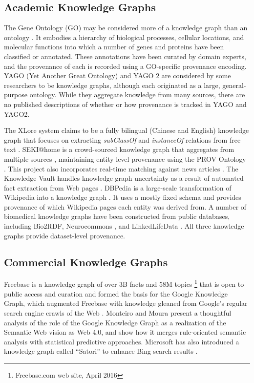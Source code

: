 \documentclass[runningheads,a4paper]{llncs}
\begin{document}
\subsection{Academic Knowledge Graphs}
The Gene Ontology (GO) may be considered more of a knowledge graph than an ontology \cite{Ashburner_2000}.
It embodies a hierarchy of biological processes, cellular locations, and molecular functions into which a number of genes and proteins have been classified or annotated.
These annotations have been curated by domain experts, and the provenance of each is recorded using a GO-specific provenance encoding.
YAGO (Yet Another Great Ontology) \cite{Suchanek_2007} and YAGO 2 \cite{Hoffart_2013} are considered by some researchers to be knowledge graphs, although each originated as a large, general-purpose ontology.
While they aggregate knowledge from many sources, there are no published descriptions of whether or how provenance is tracked in YAGO and YAGO2. 

The XLore system claims to be a fully bilingual (Chinese and English) knowledge graph that focuses on extracting \emph{subClassOf} and \emph{instanceOf} relations from free text \cite{wang2013xlore}.
SEKI@home is a crowd-sourced knowledge graph that aggregates from multiple sources \cite{steiner2012seki}, maintaining entity-level provenance using the PROV Ontology \cite{Moreau_2015}.
This project also incorporates real-time matching against news articles \cite{steiner_iswc_2012}.
The Knowledge Vault handles knowledge graph uncertainty as a result of automated fact extraction from Web pages \cite{Dong_2014}.
DBPedia is a large-scale transformation of Wikipedia into a knowledge graph \cite{Bizer_2009}.
It uses a mostly fixed schema and provides provenance of which Wikipedia pages each entity was derived from.
A number of biomedical knowledge graphs have been constructed from public databases, including Bio2RDF\cite{Callahan_2013}, Neurocommons \cite{Ruttenberg_2009}, and LinkedLifeData \cite{momtchev2009expanding}.
All three knowledge graphs provide dataset-level provenance.

\subsection{Commercial Knowledge Graphs}
Freebase is a knowledge graph of over 3B facts and 58M topics \footnote{Freebase.com web site, April 2016} that is open to public access and curation \cite{Bollacker_2008} and formed the basis for the Google Knowledge Graph, which augmented Freebase with knowledge gleaned from Google's regular search engine crawls of the Web \cite{singhal2012introducing}.
Monteiro and Moura \cite{10110943220141101} present a thoughtful analysis of the role of the Google Knowledge Graph as a realization of the Semantic Web vision \cite{bernerslee2000semantic} as Web 4.0, and show how it merges rule-oriented semantic analysis with statistical predictive approaches.
Microsoft has also introduced a knowledge graph called ``Satori'' to enhance Bing search results \cite{qian2013understand}.
\end{document}
